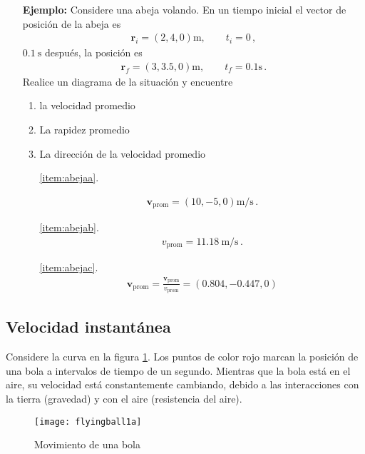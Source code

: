 \begin{itemize}
\item[\textbf{Ejemplo:}] Considere una abeja volando. En un tiempo inicial el vector de posición de la abeja es
  \begin{align}
    \mathbf{r}_i=(2,4,0)\si{\meter},\qquad t_i=0\,,
  \end{align}
$\SI{0.1}{\second}$ después, la posición es
\begin{align}
  \mathbf{r}_f=(3,3.5,0)\si{\meter},\qquad t_f=0.1\si{\second}\,.
\end{align}
Realice un diagrama de la situación y encuentre
\begin{enumerate}
\item la velocidad promedio
  \label{item:abejaa}
\item La rapidez promedio
  \label{item:abejab}
\item La dirección de la velocidad promedio
  \label{item:abejac}
\end{enumerate}
\begin{itemize}
\item[\ref{item:abejaa}.] 

\begin{align*}
  \mathbf{v}_{\text{prom}}=(10,-5,0)\si{\meter\per\second}\,.
\end{align*}

\item[\ref{item:abejab}.]
\begin{align*}
  v_{\text{prom}}=\SI{11.18}{\meter\per\second}\,.
\end{align*}
\item[\ref{item:abejac}.]
  \begin{align*}
    \hat{\mathbf{v}}_{\text{prom}}=\frac{\mathbf{v}_{\text{prom}}}{v_{\text{prom}}}=(0.804,-0.447,0)
  \end{align*}

\end{itemize}
\end{itemize}

\subsection{Velocidad instantánea}

Considere la curva en la figura \ref{fig:flyingball1a}. Los puntos de color rojo marcan la posición de una bola a intervalos de tiempo de un segundo. Mientras que la bola está en el aire, su velocidad está constantemente cambiando, debido a las interacciones con la tierra (gravedad) y con el aire (resistencia del aire). 
\begin{figure}
  \centering
  \texttt{[image: flyingball1a]}
  \caption{Movimiento de una bola}
  \label{fig:flyingball1a}
\end{figure}

